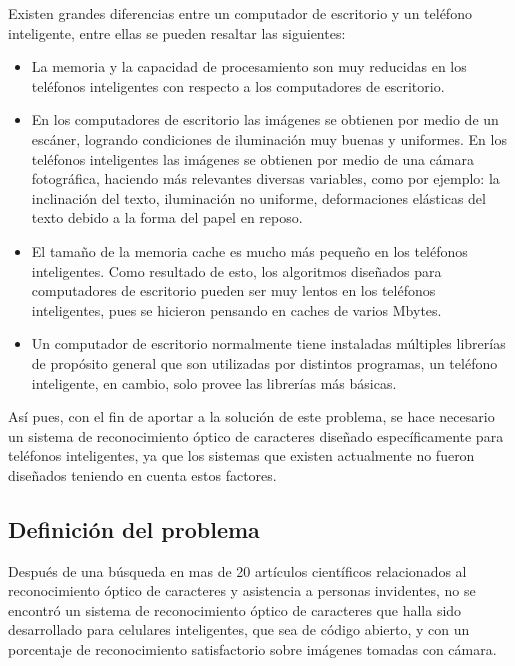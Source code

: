 \documentclass[a4paper, 11pt, oneside]{article}
\begin{document}
	Existen grandes diferencias entre un computador de escritorio y un teléfono inteligente, entre ellas se pueden resaltar las siguientes:
	\begin{itemize}
	\item La memoria y la capacidad de procesamiento son muy reducidas en los teléfonos inteligentes con respecto a los computadores de escritorio.

	\item En los computadores de escritorio las imágenes se obtienen por medio de un escáner, logrando condiciones de iluminación muy buenas y uniformes. En los teléfonos inteligentes las imágenes se obtienen por medio de una cámara fotográfica, haciendo más relevantes diversas variables, como por ejemplo: la inclinación del texto, iluminación no uniforme, deformaciones elásticas del texto debido a la forma del papel en reposo.

	\item El tamaño de la memoria cache es mucho más pequeño en los teléfonos inteligentes. Como resultado de esto, los algoritmos diseñados para computadores de escritorio pueden ser muy lentos en los teléfonos inteligentes, pues se hicieron pensando en caches de varios Mbytes.

	\item Un computador de escritorio normalmente tiene instaladas múltiples librerías de propósito general que son utilizadas por distintos programas, un teléfono inteligente, en cambio, solo provee las librerías más básicas.
	\end{itemize}

	Así pues, con el fin de aportar a la solución de este problema, se hace necesario un sistema de reconocimiento óptico de caracteres diseñado específicamente para teléfonos inteligentes, ya que los sistemas que existen actualmente no fueron diseñados teniendo en cuenta estos factores. 
	
	\subsection{Definición del problema}
	Después de una búsqueda en mas de 20 artículos científicos relacionados al reconocimiento óptico
	de caracteres y asistencia a personas invidentes, no se encontró un sistema de reconocimiento
	óptico de caracteres que halla sido desarrollado para celulares inteligentes, que sea de 
	código abierto, y con un porcentaje de reconocimiento satisfactorio sobre imágenes tomadas con
	cámara.
	
\end{document}
